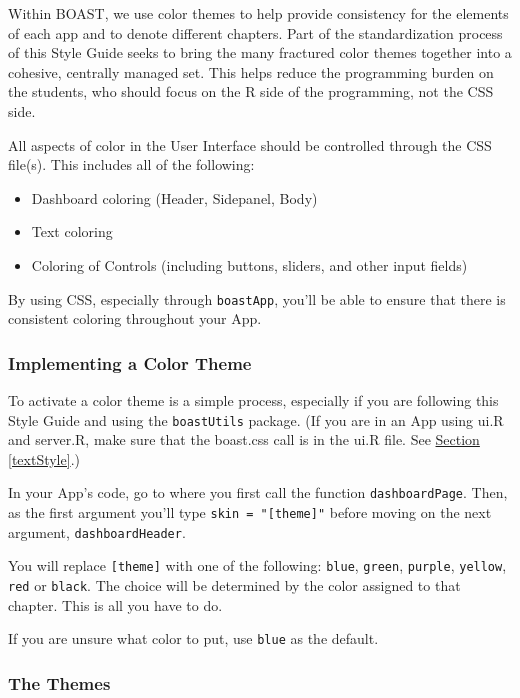 \documentclass[
]{book}
\providecommand{\tightlist}{%
  \setlength{\itemsep}{0pt}\setlength{\parskip}{0pt}}
\begin{document}
Within BOAST, we use color themes to help provide consistency for the elements of each app and to denote different chapters. Part of the standardization process of this Style Guide seeks to bring the many fractured color themes together into a cohesive, centrally managed set. This helps reduce the programming burden on the students, who should focus on the R side of the programming, not the CSS side.

All aspects of color in the User Interface should be controlled through the CSS file(s). This includes all of the following:

\begin{itemize}
\tightlist
\item
  Dashboard coloring (Header, Sidepanel, Body)
\item
  Text coloring
\item
  Coloring of Controls (including buttons, sliders, and other input fields)
\end{itemize}

By using CSS, especially through \texttt{boastApp}, you'll be able to ensure that there is consistent coloring throughout your App.

\hypertarget{implementing-a-color-theme-1}{%
\subsubsection{Implementing a Color Theme}\label{implementing-a-color-theme-1}}

To activate a color theme is a simple process, especially if you are following this Style Guide and using the \texttt{boastUtils} package. (If you are in an App using ui.R and server.R, make sure that the boast.css call is in the ui.R file. See \protect\hyperlink{textStyle}{Section \ref{textStyle}}.)

In your App's code, go to where you first call the function \texttt{dashboardPage}. Then, as the first argument you'll type \texttt{skin\ =\ "{[}theme{]}"} before moving on the next argument, \texttt{dashboardHeader}.

You will replace \texttt{{[}theme{]}} with one of the following: \texttt{blue}, \texttt{green}, \texttt{purple}, \texttt{yellow}, \texttt{red} or \texttt{black}. The choice will be determined by the color assigned to that chapter. This is all you have to do.

If you are unsure what color to put, use \texttt{blue} as the default.

\hypertarget{the-themes-1}{%
\subsubsection{The Themes}\label{the-themes-1}}
\end{document}
